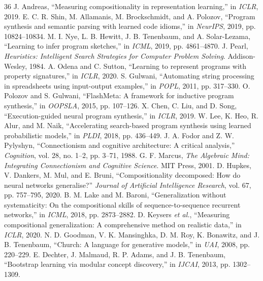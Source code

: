 \documentclass[10pt,twocolumn]{article}
\begin{document}
\begin{thebibliography}{36}
 J. Andreas, ``Measuring compositionality in representation learning,'' in \emph{ICLR}, 2019.
 E. C. R. Shin, M. Allamanis, M. Brockschmidt, and A. Polozov, ``Program synthesis and semantic parsing with learned code idioms,'' in \emph{NeurIPS}, 2019, pp. 10824--10834.
 M. I. Nye, L. B. Hewitt, J. B. Tenenbaum, and A. Solar-Lezama, ``Learning to infer program sketches,'' in \emph{ICML}, 2019, pp. 4861--4870.
 J. Pearl, \emph{Heuristics: Intelligent Search Strategies for Computer Problem Solving}. Addison-Wesley, 1984.
 A. Odena and C. Sutton, ``Learning to represent programs with property signatures,'' in \emph{ICLR}, 2020.
 S. Gulwani, ``Automating string processing in spreadsheets using input-output examples,'' in \emph{POPL}, 2011, pp. 317--330.
 O. Polozov and S. Gulwani, ``FlashMeta: A framework for inductive program synthesis,'' in \emph{OOPSLA}, 2015, pp. 107--126.
 X. Chen, C. Liu, and D. Song, ``Execution-guided neural program synthesis,'' in \emph{ICLR}, 2019.
 W. Lee, K. Heo, R. Alur, and M. Naik, ``Accelerating search-based program synthesis using learned probabilistic models,'' in \emph{PLDI}, 2018, pp. 436--449.
 J. A. Fodor and Z. W. Pylyshyn, ``Connectionism and cognitive architecture: A critical analysis,'' \emph{Cognition}, vol. 28, no. 1--2, pp. 3--71, 1988.
 G. F. Marcus, \emph{The Algebraic Mind: Integrating Connectionism and Cognitive Science}. MIT Press, 2001.
 D. Hupkes, V. Dankers, M. Mul, and E. Bruni, ``Compositionality decomposed: How do neural networks generalise?'' \emph{Journal of Artificial Intelligence Research}, vol. 67, pp. 757--795, 2020.
 B. M. Lake and M. Baroni, ``Generalization without systematicity: On the compositional skills of sequence-to-sequence recurrent networks,'' in \emph{ICML}, 2018, pp. 2873--2882.
 D. Keysers \emph{et al.}, ``Measuring compositional generalization: A comprehensive method on realistic data,'' in \emph{ICLR}, 2020.
 N. D. Goodman, V. K. Mansinghka, D. M. Roy, K. Bonawitz, and J. B. Tenenbaum, ``Church: A language for generative models,'' in \emph{UAI}, 2008, pp. 220--229.
 E. Dechter, J. Malmaud, R. P. Adams, and J. B. Tenenbaum, ``Bootstrap learning via modular concept discovery,'' in \emph{IJCAI}, 2013, pp. 1302--1309.

\end{thebibliography}
\end{document}

